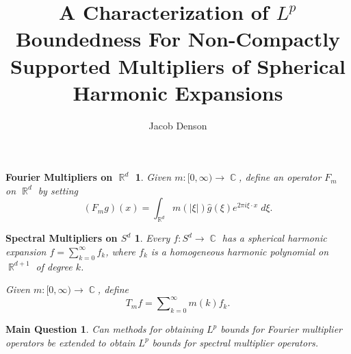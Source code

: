 \documentclass[usenames,dvipsnames,10pt]{beamer}
\title{A Characterization of $L^p$ Boundedness For Non-Compactly Supported Multipliers of Spherical Harmonic Expansions}
\author{Jacob Denson}
\institute{University of Wisconsin Madison}
\DeclareMathOperator{\RR}{\mathbb{R}}
\DeclareMathOperator{\CC}{\mathbb{C}}
\newtheorem*{goal}{Fourier Multipliers on $\RR^d$}
\newtheorem*{goall}{Spectral Multipliers on $S^d$}
\newtheorem*{mainquestion}{Main Question}
\begin{document}
\maketitle

\begin{frame}

    \begin{goal}
        Given $m: [0,\infty) \to \CC$, define an operator $F_m$ on $\RR^d$ by setting
        \[ (F_m g)(x) = \int_{\RR^d} m(|\xi|) \widehat{g}(\xi) e^{2 \pi i \xi \cdot x}\; d \xi. \]
    \end{goal}

    \pause

    \begin{goall}
        Every $f: S^d \to \CC$ has a spherical harmonic expansion $f = \sum_{k = 0}^\infty f_k$, where $f_k$ is a homogeneous harmonic polynomial on $\RR^{d+1}$ of degree $k$.\vspace{0.5em}

        Given $m: [0,\infty) \to \CC$, define
        \[ T_m f = \sum\nolimits_{k = 0}^\infty m(k) f_k. \]
    \end{goall}

    \pause

    \begin{mainquestion}
        Can methods for obtaining $L^p$ bounds for Fourier multiplier operators be extended to obtain $L^p$ bounds for spectral multiplier operators.
    \end{mainquestion}



        


\end{frame}
\end{document}
